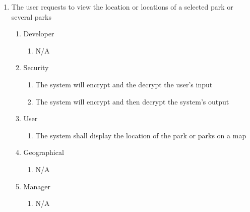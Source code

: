 \documentclass[titlepage]{article}
\begin{document}
\begin{enumerate}[{BE}1.]
    \item The user requests to view the location or locations of a selected park or several parks
    \begin{enumerate}[{VP\theenumi}.1]
        \item Developer
            \begin{enumerate}
                \item N/A
            \end{enumerate}
        \item Security
            \begin{enumerate}
                \item The system will encrypt and the decrypt the user's input
                \item The system will encrypt and then decrypt the system's output
            \end{enumerate}
        \item User
            \begin{enumerate}
                \item The system shall display the location of the park or parks on a map
            \end{enumerate}
        \item Geographical
            \begin{enumerate}
                \item N/A
            \end{enumerate}
        \item Manager
            \begin{enumerate}
                \item N/A
            \end{enumerate}
    \end{enumerate}


\end{enumerate}
\end{document}
